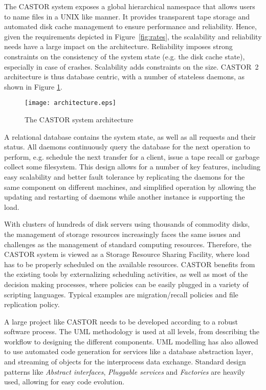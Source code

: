 The CASTOR system exposes a global hierarchical namespace that allows
users to name files in a UNIX like manner. It provides transparent tape
storage and automated disk cache management to ensure performance and reliability.
Hence, given the requirements
depicted in Figure~\ref{fig:rates}, the scalability
and reliability needs have a large impact on the architecture.
Reliability imposes strong constraints on the consistency
of the system state (e.g. the disk cache state), especially in case of crashes.
Scalability adds constraints on the size.
CASTOR~2 architecture is thus database centric, with a number
of stateless daemons, as shown in Figure \ref{fig:architecture}.

\begin{figure}[htbp]
\centering
\texttt{[image: architecture.eps]}
\caption{The CASTOR system architecture}
\label{fig:architecture}
\end{figure}

A relational database contains the system state, as well as all 
requests and their status. All daemons continuously
query the database for the next operation to perform, e.g. schedule
the next transfer for a client, issue a tape recall or garbage collect
some filesystem. This design allows for a number of key features, including
easy scalability and better fault tolerance by replicating the daemons for
the same component on different machines, and simplified operation
by allowing the updating and restarting of daemons while
another instance is supporting the load.

With clusters of hundreds of disk servers using thousands of
commodity disks, the management of storage resources increasingly
faces the same issues and challenges as the management of standard
computing resources. Therefore, the CASTOR system is viewed
as a Storage Resource Sharing Facility, where load has to be properly
scheduled on the available resources. 
CASTOR benefits from the existing tools by 
externalizing scheduling activities, as well as most of the
decision making processes, where policies can be easily
plugged in a variety of scripting languages. Typical examples
are migration/recall policies and file replication policy.

A large project like CASTOR needs to be developed according to a
robust software process.
The UML methodology is used at all levels, from describing the workflow to
designing the different components.
UML modelling has also allowed to use automated code generation for
services like a database abstraction layer, and streaming of
objects for the interprocess data exchange. Standard design patterns
like \emph{Abstract interfaces}, \emph{Pluggable services} and \emph{Factories}
are heavily used, allowing for easy code evolution.

